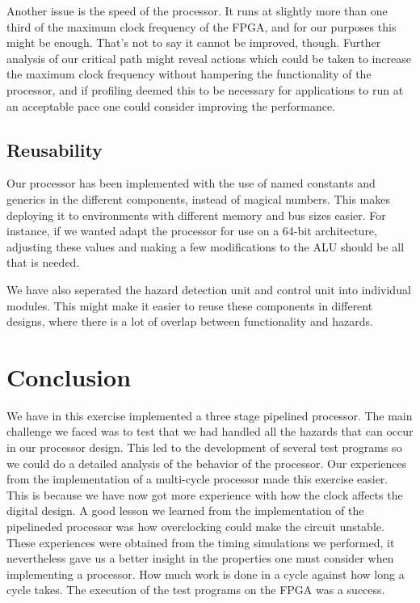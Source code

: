 \documentclass[11pt]{article}
\begin{document}
\newpage{} 

Another issue is the speed of the processor. It runs at slightly more
than one third of the maximum clock frequency of the FPGA, and for our
purposes this might be enough. That's not to say it cannot be
improved, though. Further analysis of our critical path might reveal
actions which could be taken to increase the maximum clock frequency
without hampering the functionality of the processor, and if profiling
deemed this to be necessary for applications to run at an acceptable
pace one could consider improving the performance.

\subsection{Reusability}
\label{subsec:reusability}
Our processor has been implemented with the use of named constants and
generics in the different components, instead of magical numbers. This
makes deploying it to environments with different memory and bus sizes
easier. For instance, if we wanted adapt the processor for use on a
64-bit architecture, adjusting these values and making a few
modifications to the ALU should be all that is needed.

We have also seperated the hazard detection unit and control unit into
individual modules. This might make it easier to reuse these
components in different designs, where there is a lot of overlap
between functionality and hazards.

\section{Conclusion}
\label{sec:conclusion}
We have in this exercise implemented a three stage pipelined
processor. The main challenge we faced was to test that we had handled
all the hazards that can occur in our processor design. This led to
the development of several test programs so we could do a detailed
analysis of the behavior of the processor.  Our experiences from the
implementation of a multi-cycle processor made this exercise
easier. This is because we have now got more experience with how the
clock affects the digital design. A good lesson we learned from the
implementation of the pipelineded processor was how overclocking could
make the circuit unstable.  These experiences were obtained from the
timing simulations we performed, it nevertheless gave us a better
insight in the properties one must consider when implementing a
processor. How much work is done in a cycle against how long a cycle
takes. The execution of the test programs on the FPGA was a success.
\end{document}

